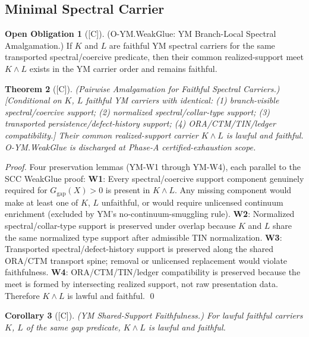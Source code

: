 \documentclass[12pt,oneside]{amsbook}
\theoremstyle{plain}
\newtheorem{theorem}{Theorem}[section]
\newtheorem{corollary}[theorem]{Corollary}
\theoremstyle{definition}
\newtheorem{obligation}[theorem]{Open Obligation}
\theoremstyle{remark}
\newcommand{\status}[1]{\textup{[#1]}}
\begin{document}
\subsection{Minimal Spectral Carrier}

\begin{obligation}[\status{C}]\label{ob:O-YM-WeakGlue}
\textup{(O-YM.WeakGlue: YM Branch-Local Spectral Amalgamation.)}
If $K$ and $L$ are faithful YM spectral carriers for the same
transported spectral/coercive predicate, then their common
realized-support meet $K \wedge L$ exists in the YM carrier order
and remains faithful.
\end{obligation}

\begin{theorem}[\status{C}]\label{thm:YM-WeakGlue}
\textup{(Pairwise Amalgamation for Faithful Spectral Carriers.)}
\textup{[Conditional on $K$, $L$ faithful YM carriers with identical:
(1) branch-visible spectral/coercive support; (2) normalized
spectral/collar-type support; (3) transported persistence/defect-history
support; (4) ORA/CTM/TIN/ledger compatibility.]}
Their common realized-support carrier $K \wedge L$ is lawful and faithful.
O-YM.WeakGlue is discharged at Phase-A certified-exhaustion scope.
\end{theorem}

\begin{proof}
Four preservation lemmas (YM-W1 through YM-W4), each parallel to
the SCC WeakGlue proof:
\textbf{W1}: Every spectral/coercive support component genuinely required
for $G_{\mathrm{gap}}(X) > 0$ is present in $K \wedge L$.
Any missing component would make at least one of $K$, $L$ unfaithful,
or would require unlicensed continuum enrichment (excluded by
YM's no-continuum-smuggling rule).
\textbf{W2}: Normalized spectral/collar-type support is preserved under
overlap because $K$ and $L$ share the same normalized type support
after admissible TIN normalization.
\textbf{W3}: Transported spectral/defect-history support is preserved
along the shared ORA/CTM transport spine; removal or unlicensed
replacement would violate faithfulness.
\textbf{W4}: ORA/CTM/TIN/ledger compatibility is preserved because
the meet is formed by intersecting realized support, not raw
presentation data.
Therefore $K \wedge L$ is lawful and faithful.
\qed
\end{proof}

\begin{corollary}[\status{C}]\label{cor:YM-SSF}
\textup{(YM Shared-Support Faithfulness.)}
For lawful faithful carriers $K$, $L$ of the same gap predicate,
$K \wedge L$ is lawful and faithful.
\end{corollary}
\end{document}
